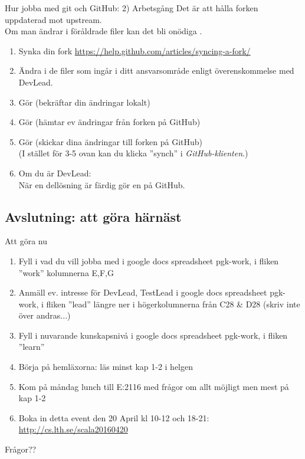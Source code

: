 \documentclass{slides}
\begin{document}
\begin{Slide}{Hur jobba med git och GitHub: 2) Arbetsgång}\footnotesize
Det är  att hålla forken uppdaterad mot upstream.\\
Om man ändrar i föråldrade filer kan det bli onödiga .
\begin{enumerate}
\item Synka din fork \url{https://help.github.com/articles/syncing-a-fork/}
\item Ändra i de filer som ingår i ditt ansvarsområde enligt överenskommelse med DevLead.
\item Gör  (bekräftar din ändringar lokalt)
\item Gör  (hämtar ev ändringar från forken på GitHub)
\item Gör  (skickar dina ändringar till forken på GitHub) \\
(I stället för 3-5 ovan kan du klicka ''synch'' i \emph{GitHub-klienten}.)
\item Om du är DevLead:\\ När en dellösning är färdig gör en  på GitHub.  
\end{enumerate}
\end{Slide}

\subsection{Avslutning: att göra härnäst}
\begin{Slide}{Att göra nu}
\begin{enumerate}
\item Fyll i vad du vill jobba med i google docs spreadsheet pgk-work, i fliken ''work'' kolumnerna E,F,G
\item Anmäll ev. intresse för DevLead, TestLead i google docs spreadsheet pgk-work, i fliken ''lead'' längre ner i högerkolumnerna från C28 \& D28 (skriv inte över andras...)
\item Fyll i nuvarande kunskapsnivå i google docs spreadsheet pgk-work, i fliken ''learn''
\item Börja på hemläxorna: läs minst kap 1-2 i helgen
\item Kom på måndag lunch till E:2116 med frågor om allt möjligt men mest på kap 1-2 
\item Boka in detta event den 20 April kl 10-12 och 18-21: \\
\url{http://cs.lth.se/scala20160420}
\end{enumerate}
Frågor??
\end{Slide}
\end{document}
